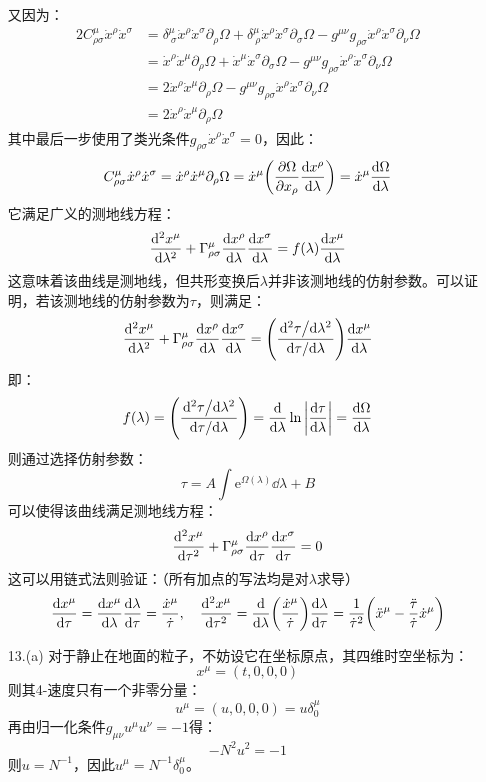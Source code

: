 \documentclass[a4paper]{article}
\begin{document}
\begin{enumerate}
\[    \]
    又因为：
    \begin{align*}
        2 C^\mu_{\rho\sigma} \dot{x}^\rho \dot{x}^\sigma
        &= \delta^\mu_{\ \sigma} \dot{x}^\rho \dot{x}^\sigma \partial_\rho \Omega + \delta^\mu_{\ \rho} \dot{x}^\rho \dot{x}^\sigma \partial_\sigma \Omega - g^{\mu\nu} g_{\rho\sigma} \dot{x}^\rho \dot{x}^\sigma \partial_\nu \Omega \\
        &= \dot{x}^\rho \dot{x}^\mu \partial_\rho \Omega + \dot{x}^\mu \dot{x}^\sigma \partial_\sigma \Omega - g^{\mu\nu} g_{\rho\sigma} \dot{x}^\rho \dot{x}^\sigma \partial_\nu \Omega \\
        &= 2 \dot{x}^\rho \dot{x}^\mu \partial_\rho \Omega - g^{\mu\nu} g_{\rho\sigma} \dot{x}^\rho \dot{x}^\sigma \partial_\nu \Omega \\
        &= 2 \dot{x}^\rho \dot{x}^\mu \partial_\rho \Omega
    \end{align*}
    其中最后一步使用了类光条件$g_{\rho\sigma} \dot{x}^\rho \dot{x}^\sigma = 0$，因此：
    \[
        C^\mu_{\rho\sigma} \dot{x}^\rho \dot{x}^\sigma = \dot{x}^\rho \dot{x}^\mu \partial_\rho \Omega = \dot{x}^\mu \qty(\pdv{\Omega}{x_\rho} \dv{x^\rho}{\lambda}) = \dot{x}^\mu \dv{\Omega}{\lambda}
    \]
    它满足广义的测地线方程：
    \[
        \dv[2]{x^\mu}{\lambda} + \Gamma^\mu_{\rho\sigma} \dv{x^\rho}{\lambda} \dv{x^\sigma}{\lambda} = f(\lambda) \dv{x^\mu}{\lambda}
    \]
    这意味着该曲线是测地线，但共形变换后$\lambda$并非该测地线的仿射参数。可以证明，若该测地线的仿射参数为$\tau$，则满足：
    \[
        \dv[2]{x^\mu}{\lambda} + \Gamma^\mu_{\rho\sigma} \dv{x^\rho}{\lambda} \dv{x^\sigma}{\lambda} = \qty(\frac{\dv*[2]{\tau}{\lambda}}{\dv*{\tau}{\lambda}}) \dv{x^\mu}{\lambda}
    \]
    即：
    \[
        f(\lambda) = \qty(\frac{\dv*[2]{\tau}{\lambda}}{\dv*{\tau}{\lambda}}) = \dv{\lambda} \ln\abs{\dv{\tau}{\lambda}} = \dv{\Omega}{\lambda}
    \]
    则通过选择仿射参数：
    \[
        \tau = A \int \mathrm{e}^{\Omega(\lambda)} \dd{\lambda} + B
    \]
    可以使得该曲线满足测地线方程：
    \[
        \dv[2]{x^\mu}{\tau} + \Gamma^\mu_{\rho\sigma} \dv{x^\rho}{\tau} \dv{x^\sigma}{\tau} = 0
    \]
    这可以用链式法则验证：（所有加点的写法均是对$\lambda$求导）
    \[
        \dv{x^\mu}{\tau} = \dv{x^\mu}{\lambda} \dv{\lambda}{\tau} = \frac{\dot{x}^\mu}{\dot{\tau}},\quad \dv[2]{x^\mu}{\tau} = \dv{\lambda} \qty(\frac{\dot{x}^\mu}{\dot{\tau}}) \dv{\lambda}{\tau} = \frac{1}{\dot{\tau}^2} \qty(\ddot{x}^\mu - \frac{\ddot{\tau}}{\dot{\tau}} \dot{x}^\mu)
    \]

    \bigskip
    \item[13.(a)]
    对于静止在地面的粒子，不妨设它在坐标原点，其四维时空坐标为：
    \[
        x^\mu = (t, 0, 0, 0)
    \]
    则其4-速度只有一个非零分量：
    \[
        u^\mu = (u, 0, 0, 0) = u \delta_0^\mu
    \]
    再由归一化条件$g_{\mu\nu} u^\mu u^\nu = -1$得：
    \[
        -N^2 u^2 = -1
    \]
    则$u = N^{-1}$，因此$u^\mu = N^{-1} \delta_0^\mu$。


\end{enumerate}
\end{document}
